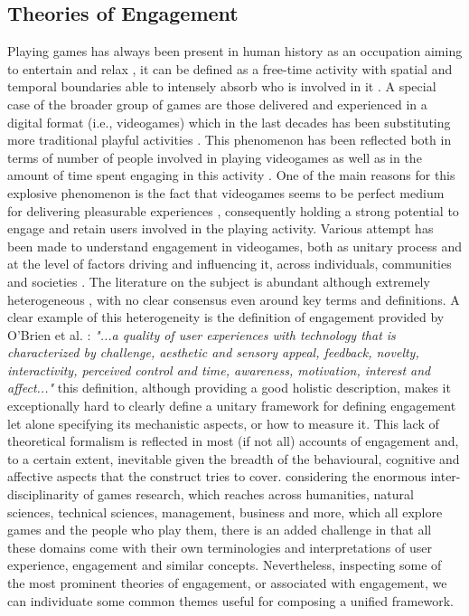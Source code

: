 \subsection{Theories of Engagement}
\label{factors_engagement}
Playing games has always been present in human history as an occupation aiming to entertain and relax \cite{connolly2012systematic}, it can be defined as a free-time activity with spatial and temporal boundaries able to intensely absorb who is involved in it \cite{connolly2012systematic}. A special case of the broader group of games are those delivered and experienced in a digital format (i.e., videogames) which in the last decades has been substituting more traditional playful activities \cite{boyle2012engagement,connolly2012systematic}. This phenomenon has been reflected both in terms of number of people involved in playing videogames as well as in the amount of time spent engaging in this activity \cite{boyle2012engagement, zendle2022transnational}. One of the main reasons for this explosive phenomenon is the fact that videogames seems to be perfect medium for delivering pleasurable experiences \cite{boyle2012engagement}, consequently holding a strong potential to engage and retain users involved in the playing activity. Various attempt has been made to understand engagement in videogames, both as unitary process and at the level of factors driving and influencing it, across individuals, communities and societies \cite{boyle2012engagement}. The literature on the subject is abundant although extremely heterogeneous \cite{boyle2012engagement}, with no clear consensus even around key terms and definitions. A clear example of this heterogeneity is the definition of engagement provided by O'Brien et al. \cite{o2008user}:
\textit{"...a quality of user experiences with technology that is characterized by challenge, aesthetic and sensory appeal, feedback, novelty, interactivity, perceived control and time, awareness, motivation, interest and affect..."}
this definition, although providing a good holistic description, makes it exceptionally hard to clearly define a unitary framework for defining engagement let alone specifying its mechanistic aspects, or how to measure it. This lack of theoretical formalism is reflected in most (if not all) accounts of engagement and, to a certain extent, inevitable given the breadth of the behavioural, cognitive and affective aspects that the construct tries to cover. considering the enormous inter-disciplinarity of games research, which reaches across humanities, natural sciences, technical sciences, management, business and more, which all explore games and the people who play them, there is an added challenge in that all these domains come with their own terminologies and interpretations of user experience, engagement and similar concepts. Nevertheless, inspecting some of the most prominent theories of engagement, or associated with engagement, we can individuate some common themes useful for composing a unified framework.

